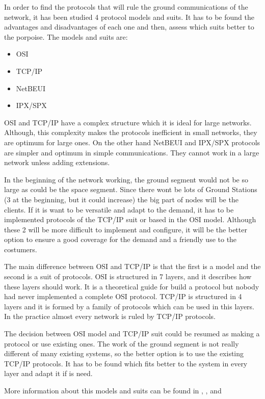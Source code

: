 In order to find the protocols that will rule the ground communications of the network, it has been studied 4 protocol models and suits. It has to be found the advantages and disadvantages of each one and then, assess which suits better to the porpoise. The models and suits are:
\begin{itemize}
\item OSI
\item TCP/IP
\item NetBEUI
\item IPX/SPX
\end{itemize}

OSI and TCP/IP have a complex structure which it is ideal for large networks. Although, this complexity makes the protocols inefficient in small networks, they are optimum for large ones. On the other hand NetBEUI and IPX/SPX protocols are simpler and optimum in simple communications. They cannot work in a large network unless adding extensions. 

In the beginning of the network working, the ground segment would not be so large as could be the space segment. Since there wont be lots of Ground Stations (3 at the beginning, but it could increase) the big part of nodes will be the clients. If it is want to be versatile and adapt to the demand, it has to be implemented protocols of the TCP/IP suit or based in the OSI model. Although these 2 will be more difficult to implement and configure, it will be the better option to ensure a good coverage for the demand and a friendly use to the costumers.

The main difference between OSI and TCP/IP is that the first is a model and the second is a suit of protocols. OSI is structured in 7 layers, and it describes how these layers should work. It is a theoretical guide for build a protocol but nobody had never implemented a complete OSI protocol. TCP/IP is structured in 4 layers and it is formed by a family of protocols which can be used in this layers. In the practice almost every network is ruled by TCP/IP protocols. 

The decision between OSI model and TCP/IP suit could be resumed as making a protocol or use existing ones. The work of the ground segment is not really different of many existing systems, so the better option is to use the existing TCP/IP protocols. It has to be found which fits better to the system in every layer and adapt it if is need.

More information about this models and suits can be found in \cite{OSI}, \cite{TCPIP}, \cite{NetBEUI} and \cite{IPX}